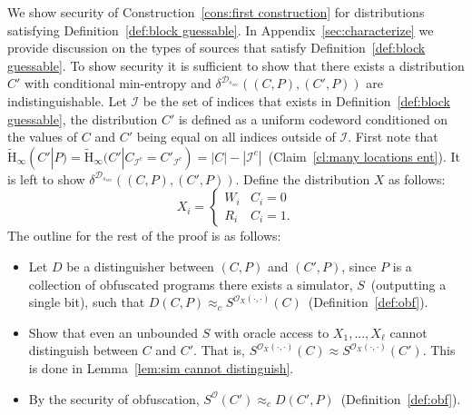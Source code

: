 \documentclass[11pt]{article}
\newcommand{\apref}[1]{\mbox{Appendix~\ref{#1}}}
\newcommand{\defref}[1]{\mbox{Definition~\ref{#1}}}
\newcommand{\corref}[1]{\mbox{Corollary~\ref{#1}}}
\newcommand{\lemref}[1]{\mbox{Lemma~\ref{#1}}}
\newcommand{\clref}[1]{\mbox{Claim~\ref{#1}}}
\newcommand{\consref}[1]{\mbox{Construction~\ref{#1}}}
\newcommand{\Hav}{\tilde{\mathrm{H}}_\infty}
\newcommand{\authnote}[2]{{\textcolor{red}{\textsf{#1 notes: }\textcolor{blue}{ #2}}\marginpar{\textcolor{red}{\textbf{!!!!!}}}}}
\newcommand{\authnote}[2]{}
\newcommand{\bnote}[1]{{\authnote{Ben}{#1}}}
\begin{document}
We show security of \consref{cons:first construction} for distributions satisfying \defref{def:block guessable}.  In \apref{sec:characterize} we provide discussion on the types of sources that satisfy \defref{def:block guessable}.
To show security it is sufficient to show that there exists a distribution $C'$ with conditional min-entropy and $\delta^{\mathcal{D}_{s_{sec}}}((C, P), (C', P))$ are indistinguishable.  Let $\mathcal{I}$ be the set of indices that exists in \defref{def:block guessable}, the distribution $C'$ is defined as a uniform codeword conditioned on the values of $C$ and $C'$ being equal on all indices outside of $\mathcal{I}$.  First note that $\Hav(C' |P) =\Hav(C' | C_{\mathcal{I}^c} = C'_{\mathcal{I}^c}) = |C| - |\mathcal{I}^c|$~(\clref{cl:many locations ent}).  It is left to show $\delta^{\mathcal{D}_{s_{sec}}}((C, P), (C', P))$.  
Define the distribution $X$ as follows:
\[X_i = 
\begin{cases}
W_i & C_i = 0\\
R_i & C_i = 1.
\end{cases}\]
The outline for the rest of the proof is as follows:
\begin{itemize}
\item Let $D$ be a distinguisher between $(C, P)$ and $(C', P)$, since $P$ is a collection of obfuscated programs there exists a simulator, $S$~(outputting a single bit), such that $D(C, P) \approx_c S^{\mathcal{O}_X(\cdot, \cdot)}(C)$~(\defref{def:obf}).
\item Show that even an unbounded $S$ with oracle access to $X_1,..., X_\ell$ cannot distinguish between $C$ and $C'$.  That is, $S^{\mathcal{O}_X(\cdot, \cdot)}(C) \approx S^{\mathcal{O}_X(\cdot, \cdot)}(C')$.
This is done in \lemref{lem:sim cannot distinguish}.
\item By the security of obfuscation, $S^{\mathcal{O}}(C') \approx_c D(C', P)$~(\defref{def:obf}).
\end{itemize}
\end{document}

